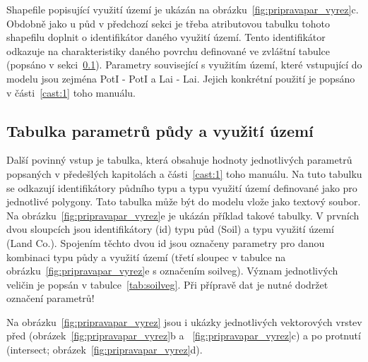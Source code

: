 Shapefile popisující využití území je ukázán na obrázku~\ref{fig:pripravapar_vyrez}c. Obdobně jako u půd v předchozí sekci je třeba atributovou tabulku tohoto shapefilu doplnit o identifikátor daného využití území. Tento identifikátor odkazuje na charakteristiky daného povrchu definované ve zvláštní tabulce (popsáno v sekci~\ref{sec:upravatabulkyparametru}). Parametry související s využitím území, které vstupující do modelu jsou zejména \acs{PotI} - \acl{PotI} a \acs{Lai} - \acl{Lai}. Jejich konkrétní použití je popsáno v části~\ref{cast:1} toho manuálu. 
% 
% 
% 
% 















\subsection{Tabulka parametrů půdy a využití území}  \label{sec:upravatabulkyparametru}

Další povinný vstup je tabulka, která obsahuje hodnoty jednotlivých parametrů popsaných v předešlých kapitolách a části~\ref{cast:1} toho manuálu. Na tuto tabulku se odkazují identifikátory půdního typu a typu využití území definované jako pro jednotlivé polygony. Tato tabulka může být do modelu vlože jako textový soubor. Na obrázku~\ref{fig:pripravapar_vyrez}e je ukázán příklad takové tabulky. V prvních dvou sloupcích jsou identifikátory (id) typu půd (Soil) a typu využití území (Land Co.). Spojením těchto dvou id jsou označeny parametry pro danou kombinaci typu půdy a využití území (třetí sloupec v tabulce na obrázku~\ref{fig:pripravapar_vyrez}e s označením soilveg). Význam jednotlivých veličin je popsán v tabulce~\ref{tab:soilveg}. Při přípravě dat je nutné dodržet označení parametrů!

Na obrázku~\ref{fig:pripravapar_vyrez} jsou i ukázky jednotlivých vektorových vrstev před (obrázek~\ref{fig:pripravapar_vyrez}b a ~\ref{fig:pripravapar_vyrez}c) a po protnutí (intersect; obrázek~\ref{fig:pripravapar_vyrez}d). 

